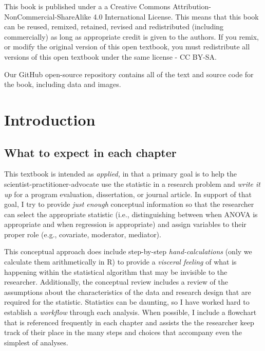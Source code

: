 \documentclass[
  english,
]{book}
\begin{document}
This book is published under a a Creative Commons Attribution-NonCommercial-ShareAlike 4.0 International License. This means that this book can be reused, remixed, retained, revised and redistributed (including commercially) as long as appropriate credit is given to the authors. If you remix, or modify the original version of this open textbook, you must redistribute all versions of this open textbook under the same license - CC BY-SA.

Our GitHub open-source repository contains all of the text and source code for the book, including data and images.

\hypertarget{ReCintro}{%
\chapter{Introduction}\label{ReCintro}}

\hypertarget{what-to-expect-in-each-chapter}{%
\section{What to expect in each chapter}\label{what-to-expect-in-each-chapter}}

This textbook is intended as \emph{applied,} in that a primary goal is to help the scientist-practitioner-advocate use the statistic in a research problem and \emph{write it up} for a program evaluation, dissertation, or journal article. In support of that goal, I try to provide \emph{just enough} conceptual information so that the researcher can select the appropriate statistic (i.e., distinguishing between when ANOVA is appropriate and when regression is appropriate) and assign variables to their proper role (e.g., covariate, moderator, mediator).

This conceptual approach does include step-by-step \emph{hand-calculations} (only we calculate them arithmetically in R) to provide a \emph{visceral feeling} of what is happening within the statistical algorithm that may be invisible to the researcher. Additionally, the conceptual review includes a review of the assumptions about the characteristics of the data and research design that are required for the statistic. Statistics can be daunting, so I have worked hard to establish a \emph{workflow} through each analysis. When possible, I include a flowchart that is referenced frequently in each chapter and assists the the researcher keep track of their place in the many steps and choices that accompany even the simplest of analyses.
\end{document}
